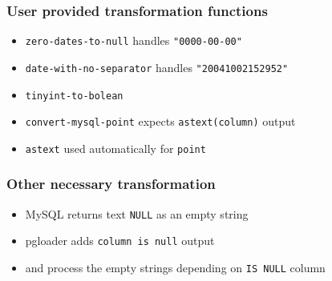 \documentclass{beamer}
\begin{document}
\begin{frame}[fragile]
  \frametitle{User provided transformation functions}
  
  \vfill

  \begin{itemize}
  \item \texttt{zero-dates-to-null} handles \texttt{"0000-00-00"}
  \item \texttt{date-with-no-separator} handles \texttt{"20041002152952"}
  \item \texttt{tinyint-to-bolean}
  \item \texttt{convert-mysql-point} expects \texttt{astext(column)} output
  \item \texttt{astext} used automatically for \texttt{point}
  \end{itemize}
\end{frame}

\begin{frame}[fragile]
  \frametitle{Other necessary transformation}
  
  \vfill

  \begin{itemize}
  \item MySQL returns text \texttt{NULL} as an empty string
  \item pgloader adds \texttt{column is null} output
  \item and process the empty strings depending on \texttt{IS NULL} column
  \end{itemize}
\end{frame}
\end{document}
